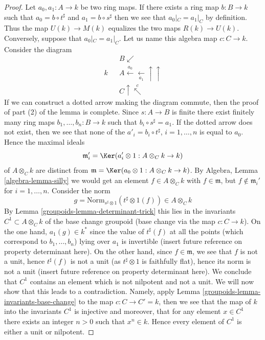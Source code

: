 \begin{proof}
\medskip\noindent
Let $a_0, a_1 : A \to k$ be two ring maps. If there exists a ring map
$b : B \to k$ such that $a_0 = b \circ t^\sharp$ and $a_1 = b \circ s^\sharp$
then we see that $a_0|_C = a_1|_C$ by definition. Thus the map
$U(k) \to M(k)$ equalizes the two maps $R(k) \to U(k)$.
Conversely, suppose that $a_0|_C = a_1|_C$. Let us name this algebra
map $c : C \to k$. Consider the diagram
$$
\begin{array}{ccc} &  & B \swarrow \\ k &  & A
\overset{a_0}{\longleftarrow}\underset{a_1}{\longleftarrow}\uparrow\uparrow \\  &  & C \uparrow\overset{c}{\nwarrow}\end{array}
$$
If we can construct a dotted arrow making the diagram commute, then
the proof of part (2) of the lemma is complete. Since $s : A \to B$ is finite
there exist finitely many ring maps
$b_1, \ldots, b_n : B \to k$ such that $b_i \circ s^\sharp = a_1$.
If the dotted arrow does not exist, then we see that none of the
$a'_i = b_i \circ t^\sharp$, $i = 1, \ldots, n$ is equal to $a_0$.
Hence the maximal ideals
$$
\mathfrak m'_i = \Ker(a_i' \otimes 1 : A \otimes_C k \to k)
$$
of $A \otimes_C k$ are distinct from
$\mathfrak m = \Ker(a_0 \otimes 1 : A \otimes_C k \to k)$.
By Algebra, Lemma \ref{algebra-lemma-silly} we would get an element
$f \in A \otimes_C k$ with $f \in \mathfrak m$, but
$f \not \in \mathfrak m_i'$ for $i = 1, \ldots, n$.
Consider the norm
$$
g = \text{Norm}_{s^\sharp \otimes 1}(t^\sharp \otimes 1(f))
\in
A \otimes_C k
$$
By Lemma \ref{groupoids-lemma-determinant-trick} this lies in the invariants
$C^1 \subset A \otimes_C k$ of the base change
groupoid (base change via the map $c : C \to k$). On the one hand,
$a_1(g) \in k^*$ since
the value of $t^\sharp(f)$ at all the points (which correspond to
$b_1, \ldots, b_n$) lying over $a_1$ is
invertible (insert future reference on property determinant here).
On the other hand, since $f \in \mathfrak m$, we see that
$f$ is not a unit, hence $t^\sharp(f)$ is not a unit
(as $t^\sharp \otimes 1$ is faithfully flat),
hence its norm is not a unit (insert future reference
on property determinant here). We conclude that $C^1$ contains
an element which is not nilpotent
and not a unit. We will now show that this leads to a contradiction.
Namely, apply Lemma \ref{groupoids-lemma-invariants-base-change}
to the map $c : C \to C' = k$, then
we see that the map of $k$ into the invariants $C^1$ is injective
and moreover, that for any element $x \in C^1$ there exists an integer
$n > 0$ such that $x^n \in k$. Hence every element of $C^1$ is
either a unit or nilpotent.


\end{proof}
